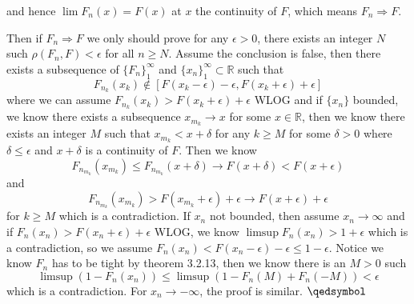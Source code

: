 \documentclass[lang=en,11pt,a4paper,citestyle =authoryear]{elegantpaper}
\newcommand{\prvd}{$\hfill \qedsymbol$}
\newcommand{\R}{\mathbb{R}}
\begin{document}
and hence $ \lim F_n(x) = F(x)$ at $x$ the continuity of $F$, which means $F_n \Rightarrow F$.\par
Then if $F_n \Rightarrow F$ we only should prove for any $\epsilon > 0$, there exists an integer $N$ such $\rho(F_n,F)< \epsilon$ for all $n\geq N$. Assume the conclusion is false, then there exists a subsequence of $\{F_n\}_1^{\infty}$ and $\{x_n\}_1^{\infty}\subset \R$ such that
\[F_{n_k}(x_k)\notin [F(x_k-\epsilon)-\epsilon,F(x_k+\epsilon)+\epsilon]\]
where we can assume $F_{n_k}(x_k) > F(x_k+\epsilon)+\epsilon$ WLOG and if $\{x_n\}$ bounded, we know there exists a subsequence $x_{m_k} \to x$ for some $x\in\R$, then we know there exists an integer $M$ such that $x_{m_k}<x+\delta$ for any $k\geq M$ for some $\delta>0$ where $\delta\leq \epsilon$ and $x+\delta$ is a continuity of $F$. Then we know
\[
F_{n_{m_k}}(x_{m_k}) \leq F_{n_{m_k}}(x+\delta) \to F(x+\delta) < F(x+\epsilon)
\]
and
\[
F_{n_{m_k}}(x_{m_k}) > F(x_{m_k}+\epsilon)+\epsilon \to F(x+\epsilon)+\epsilon
\]
for $k\geq M$ which is a contradiction. If $x_n$ not bounded, then assume $x_n\to \infty$ and if $F_{n}(x_n) > F(x_n+\epsilon)+\epsilon$ WLOG, we know $\limsup F_n(x_n) > 1+\epsilon$ which is a contradiction, so we assume $F_{n}(x_n) < F(x_n-\epsilon)-\epsilon\leq 1-\epsilon$. Notice we know $F_n$ has to be tight by theorem 3.2.13, then we know there is an $M>0$ such 
\[ \limsup(1-F_n(x_n)) \leq \limsup(1-F_n(M)+F_n(-M)) < \epsilon\]
which is a contradiction. For $x_n\to-\infty$, the proof is similar.
\prvd
\vspace{0.5em}
\end{document}
